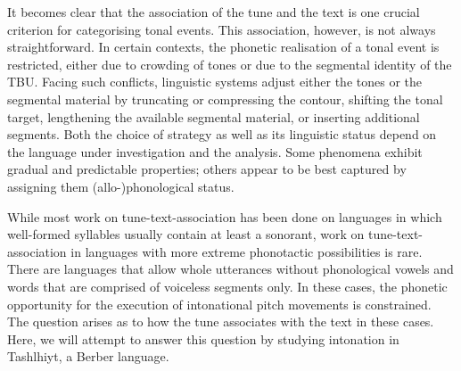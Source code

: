 It becomes clear that the association of the tune and the text is one crucial criterion for categorising tonal events. This association, however, is not always straightforward. In certain contexts, the phonetic realisation of a tonal event is restricted, either due to crowding of tones or due to the segmental identity of the TBU. Facing such conflicts, linguistic systems adjust either the tones or the segmental material by truncating or compressing the contour, shifting the tonal target, lengthening the available segmental material, or inserting additional segments. Both the choice of strategy as well as its linguistic status depend on the language under investigation and the analysis. Some phenomena exhibit gradual and predictable properties; others appear to be best captured by assigning them (allo-)phonological status.

While most work on tune-text-association has been done on languages in which well-formed syllables usually contain at least a sonorant, work on tune-text-association in languages with more extreme phonotactic possibilities is rare. There are languages that allow whole utterances without phonological vowels and words that are comprised of voiceless segments only. In these cases, the phonetic opportunity for the execution of intonational pitch movements is constrained. The question arises as to how the tune associates with the text in these cases. Here, we will attempt to answer this question by studying intonation in Tashlhiyt, a Berber language.

